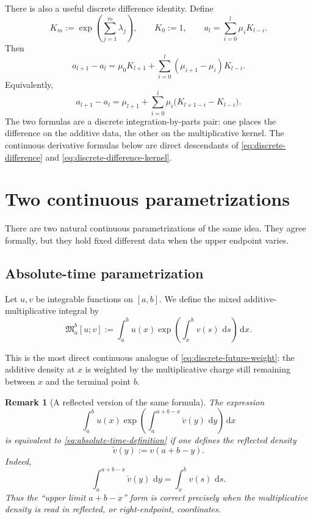 \documentclass[11pt]{article}
\newtheorem{remark}{Remark}
\newcommand{\maint}[2]{\mathfrak{M}_{#1}^{#2}}
\newcommand{\dd}{\,\mathrm{d}}
\begin{document}
There is also a useful discrete difference identity. Define
\[
K_m:=\exp\!\left(\sum_{j=1}^m \lambda_j\right),
\qquad
K_0:=1,
\qquad
a_l=\sum_{i=0}^l \mu_i K_{l-i}.
\]
Then
\begin{equation}
\label{eq:discrete-difference}
a_{l+1}-a_l
=
\mu_0K_{l+1}+\sum_{i=0}^{l}(\mu_{i+1}-\mu_i)K_{l-i}.
\end{equation}
Equivalently,
\begin{equation}
\label{eq:discrete-difference-kernel}
a_{l+1}-a_l
=
\mu_{l+1}+\sum_{i=0}^{l}\mu_i\bigl(K_{l+1-i}-K_{l-i}\bigr).
\end{equation}
The two formulas are a discrete integration-by-parts pair: one places the difference on the additive data, the other on the multiplicative kernel. The continuous derivative formulas below are direct descendants of \eqref{eq:discrete-difference} and \eqref{eq:discrete-difference-kernel}.

\section{Two continuous parametrizations}

There are two natural continuous parametrizations of the same idea. They agree formally, but they hold fixed different data when the upper endpoint varies.

\subsection{Absolute-time parametrization}

Let $u,v$ be integrable functions on $[a,b]$. We define the mixed additive-multiplicative integral by
\begin{equation}
\label{eq:absolute-time-definition}
\maint{a}{b}[u;v]
:=
\int_a^b u(x)\exp\!\left(\int_x^b v(s)\,\dd s\right)\dd x.
\end{equation}

This is the most direct continuous analogue of \eqref{eq:discrete-future-weight}: the additive density at $x$ is weighted by the multiplicative charge still remaining between $x$ and the terminal point $b$.

\begin{remark}[A reflected version of the same formula]
The expression
\[
\int_a^b u(x)\exp\!\left(\int_a^{a+b-x} \check v(y)\,\dd y\right)\dd x
\]
is equivalent to \eqref{eq:absolute-time-definition} if one defines the reflected density
\[
\check v(y):=v(a+b-y).
\]
Indeed,
\[
\int_a^{a+b-x} \check v(y)\,\dd y
=
\int_x^b v(s)\,\dd s.
\]
Thus the ``upper limit $a+b-x$'' form is correct precisely when the multiplicative density is read in reflected, or right-endpoint, coordinates.
\end{remark}
\end{document}
